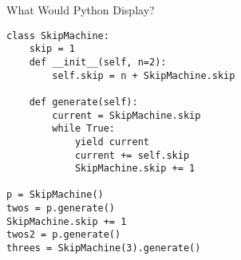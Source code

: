 \begin{blocksection}
\question What Would Python Display?
\begin{lstlisting}
class SkipMachine:
    skip = 1
    def __init__(self, n=2):
        self.skip = n + SkipMachine.skip

    def generate(self):
        current = SkipMachine.skip
        while True:
            yield current
            current += self.skip
            SkipMachine.skip += 1

p = SkipMachine()
twos = p.generate()
SkipMachine.skip += 1
twos2 = p.generate()
threes = SkipMachine(3).generate()
\end{lstlisting}
\end{blocksection}

